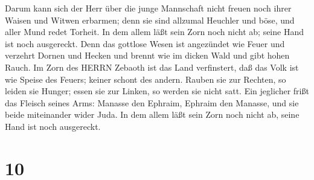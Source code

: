  Darum kann sich der Herr über die junge Mannschaft nicht
freuen noch ihrer Waisen und Witwen erbarmen; denn sie sind allzumal
Heuchler und böse, und aller Mund redet Torheit. In dem allem läßt sein
Zorn noch nicht ab; seine Hand ist noch ausgereckt.  Denn
das gottlose Wesen ist angezündet wie Feuer und verzehrt Dornen und
Hecken und brennt wie im dicken Wald und gibt hohen Rauch. 
Im Zorn des HERRN Zebaoth ist das Land verfinstert, daß das Volk ist wie
Speise des Feuers; keiner schont des andern.  Rauben sie
zur Rechten, so leiden sie Hunger; essen sie zur Linken, so werden sie
nicht satt. Ein jeglicher frißt das Fleisch seines Arms: 
Manasse den Ephraim, Ephraim den Manasse, und sie beide miteinander
wider Juda. In dem allem läßt sein Zorn noch nicht ab, seine Hand ist
noch ausgereckt.

\hypertarget{section-9}{%
\section{10}\label{section-9}}

